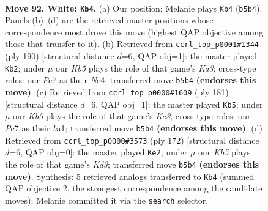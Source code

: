 \documentclass[11pt]{article}
\begin{document}
\clearpage

\begin{figure}[p]\centering
\begin{subfigure}{0.46\textwidth}\centering
\resizebox{\linewidth}{!}{%
\newchessgame
\chessboard[
  setfen={6k1/2P5/8/1K2B3/8/8/8/8 w - - 9 92},
  showmover=false,
  pgfstyle=straightmove, color=movearrow, markmove={b5-b4}
]}
\caption{}
\end{subfigure}\hfill
\begin{subfigure}{0.46\textwidth}\centering
\resizebox{\linewidth}{!}{%
\newchessgame
\chessboard[
  setfen={8/8/8/8/4N3/K2B4/8/3k4 w - - 18 96},
  showmover=false,
  pgfstyle=straightmove, color=movearrow, markmove={a3-b2}
]}
\caption{}
\end{subfigure}
\\[4pt]
\begin{subfigure}{0.46\textwidth}\centering
\resizebox{\linewidth}{!}{%
\newchessgame
\chessboard[
  setfen={8/8/2k3b1/8/8/8/8/B1K5 b - - 3 91},
  showmover=false,
  pgfstyle=straightmove, color=movearrow, markmove={c6-b5}
]}
\caption{}
\end{subfigure}\hfill
\begin{subfigure}{0.46\textwidth}\centering
\resizebox{\linewidth}{!}{%
\newchessgame
\chessboard[
  setfen={8/8/8/4k3/8/3K2p1/8/7B w - - 2 87},
  showmover=false,
  pgfstyle=straightmove, color=movearrow, markmove={d3-e2}
]}
\caption{}
\end{subfigure}
\caption{\textbf{Move 92, White: \texttt{Kb4}.} (a) Our position; Melanie plays \texttt{Kb4} (\texttt{b5b4}). Panels (b)--(d) are the retrieved master positions whose correspondence most drove this move (highest QAP objective among those that transfer to it). (b) Retrieved from \texttt{ccrl\_top\_p0001\#1344} (ply 190) [structural distance $d$=6, QAP obj=1]: the master played \texttt{Kb2}; under $\mu$ our \emph{Kb5} plays the role of that game's \emph{Ka3}; cross-type roles: our \emph{P}c7 as their \emph{N}e4; transferred move \texttt{b5b4} \textbf{(endorses this move)}. (c) Retrieved from \texttt{ccrl\_top\_p0000\#1609} (ply 181) [structural distance $d$=6, QAP obj=1]: the master played \texttt{Kb5}; under $\mu$ our \emph{Kb5} plays the role of that game's \emph{Kc3}; cross-type roles: our \emph{P}c7 as their \emph{b}a1; transferred move \texttt{b5b4} \textbf{(endorses this move)}. (d) Retrieved from \texttt{ccrl\_top\_p0000\#3573} (ply 172) [structural distance $d$=6, QAP obj=0]: the master played \texttt{Ke2}; under $\mu$ our \emph{Kb5} plays the role of that game's \emph{Kd3}; transferred move \texttt{b5b4} \textbf{(endorses this move)}. Synthesis: 5 retrieved analogs transferred to \texttt{Kb4} (summed QAP objective 2, the strongest correspondence among the candidate moves); Melanie committed it via the \texttt{search} selector.}
\label{fig:thought-m182}
\end{figure}
\end{document}
